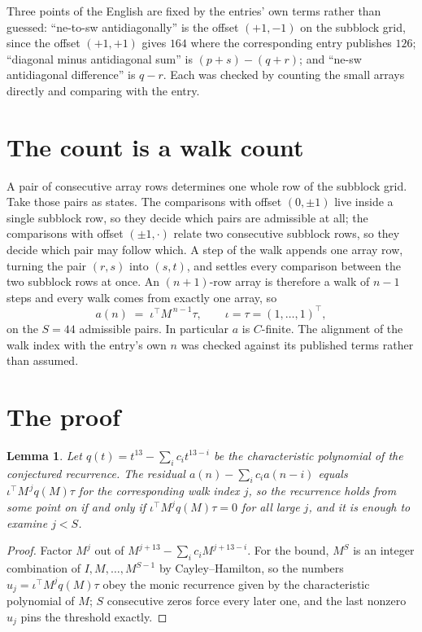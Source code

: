 \documentclass[11pt,a4paper]{article}
\theoremstyle{plain}
\newtheorem{lemma}[theorem]{Lemma}
\theoremstyle{definition}
\begin{document}
Three points of the English are fixed by the entries' own terms rather than guessed:
``ne-to-sw antidiagonally'' is the offset $(+1,-1)$ on the subblock grid, since the offset
$(+1,+1)$ gives $164$ where the corresponding entry publishes $126$; ``diagonal minus
antidiagonal sum'' is $(p+s)-(q+r)$; and ``ne-sw antidiagonal difference'' is $q-r$. Each was
checked by counting the small arrays directly and comparing with the entry.

\section{The count is a walk count}

A pair of consecutive array rows determines one whole row of the subblock grid. Take those
pairs as states. The comparisons with offset $(0,\pm1)$ live inside a single subblock row, so
they decide which pairs are admissible at all; the comparisons with offset $(\pm1,\cdot)$
relate two consecutive subblock rows, so they decide which pair may follow which. A step of the
walk appends one array row, turning the pair $(r,s)$ into $(s,t)$, and settles every comparison
between the two subblock rows at once. An $(n+1)$-row array is therefore a walk of $n-1$ steps
and every walk comes from exactly one array, so
\[
a(n)\;=\;\iota^{\!\top}M^{\,n-1}\tau,\qquad \iota=\tau=(1,\dots,1)^{\!\top},
\]
on the $S=44$ admissible pairs. In particular $a$ is $C$-finite. The alignment of the walk
index with the entry's own $n$ was checked against its published terms rather than assumed.

\section{The proof}

\begin{lemma}\label{lem:crit}
Let $q(t)=t^{13}-\sum_i c_it^{13-i}$ be the characteristic polynomial of the
conjectured recurrence. The residual $a(n)-\sum_ic_ia(n-i)$ equals
$\iota^{\!\top}M^{\,j}q(M)\tau$ for the corresponding walk index $j$, so the recurrence
holds from some point on if and only if $\iota^{\!\top}M^{j}q(M)\tau=0$ for all large $j$,
and it is enough to examine $j<S$.
\end{lemma}

\begin{proof}
Factor $M^{j}$ out of $M^{j+13}-\sum_ic_iM^{j+13-i}$. For the bound, $M^{S}$
is an integer combination of $I,M,\dots,M^{S-1}$ by Cayley--Hamilton, so the numbers
$u_j=\iota^{\!\top}M^{j}q(M)\tau$ obey the monic recurrence given by the characteristic
polynomial of $M$; $S$ consecutive zeros force every later one, and the last nonzero $u_j$
pins the threshold exactly.
\end{proof}
\end{document}
